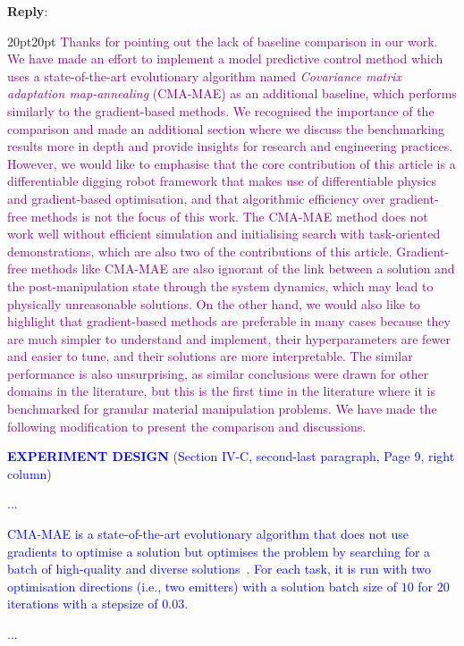 \documentclass[11pt]{article}
\newcounter{reviewer}
\newcounter{point}[reviewer]
\newenvironment{reply}
   {\medskip \noindent \begin{sf}\textbf{Reply}: \  }
   {\medskip \end{sf}}
\newcommand{\rp}[1]{\textcolor{purple}{#1}}
\newcommand{\xt}[1]{\textcolor{blue}{#1}}
\begin{document}
\begin{reply}
\begin{adjustwidth}{20pt}{20pt}
\rp{Thanks for pointing out the lack of baseline comparison in our work. We have made an effort to implement a model predictive control method which uses a state-of-the-art evolutionary algorithm named \textit{Covariance matrix adaptation map-annealing} (CMA-MAE) as an additional baseline, which performs similarly to the gradient-based methods. We recognised the importance of the comparison and made an additional section where we discuss the benchmarking results more in depth and provide insights for research and engineering practices. However, we would like to emphasise that the core contribution of this article is a differentiable digging robot framework that makes use of differentiable physics and gradient-based optimisation, and that algorithmic efficiency over gradient-free methods is not the focus of this work. The CMA-MAE method does not work well without efficient simulation and initialising search with task-oriented demonstrations, which are also two of the contributions of this article. Gradient-free methods like CMA-MAE are also ignorant of the link between a solution and the post-manipulation state through the system dynamics, which may lead to physically unreasonable solutions. On the other hand, we would also like to highlight that gradient-based methods are preferable in many cases because they are much simpler to understand and implement, their hyperparameters are fewer and easier to tune, and their solutions are more interpretable. The similar performance is also unsurprising, as similar conclusions were drawn for other domains in the literature, but this is the first time in the literature where it is benchmarked for granular material manipulation problems. We have made the following modification to present the comparison and discussions.}

\vspace{0.3cm}\noindent\xt{\textbf{EXPERIMENT DESIGN} (Section IV-C, second-last paragraph, Page 9, right column)}

\xt{...}

\xt{CMA-MAE is a state-of-the-art evolutionary algorithm that does not use gradients to optimise a solution but optimises the problem by searching for a batch of high-quality and diverse solutions~\cite{fontaine2023cmamae, tjanaka2023pyribs}. For each task, it is run with two optimisation directions (i.e., two emitters) with a solution batch size of $10$ for $20$ iterations with a stepsize of $0.03$.}

\xt{...}


\end{adjustwidth}
\end{reply}
\end{document}
